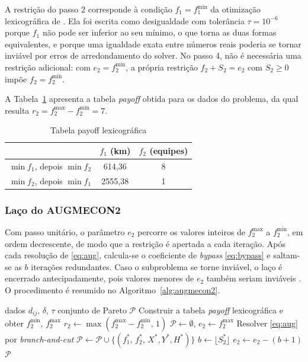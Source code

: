 \documentclass[conference]{IEEEtran}
\begin{document}
A restrição do passo 2 corresponde à condição $f_1 = f_1^{\min}$ da otimização lexicográfica de \cite{mavrotas2009}. Ela foi escrita como desigualdade com tolerância $\tau = 10^{-6}$ porque $f_1$ não pode ser inferior ao seu mínimo, o que torna as duas formas equivalentes, e porque uma igualdade exata entre números reais poderia se tornar inviável por erros de arredondamento do solver. No passo 4, não é necessária uma restrição adicional: com $e_2 = f_2^{\min}$, a própria restrição $f_2 + S_2 = e_2$ com $S_2 \ge 0$ impõe $f_2 = f_2^{\min}$.

A Tabela~\ref{tab:payoff} apresenta a tabela \textit{payoff} obtida para os dados do problema, da qual resulta $r_2 = f_2^{\max} - f_2^{\min} = 7$.

\begin{table}[!t]
\renewcommand{\arraystretch}{1.2}
\caption{Tabela payoff lexicográfica}
\label{tab:payoff}
\centering
\begin{tabular}{lcc}
\hline
 & $f_1$ (km) & $f_2$ (equipes)\\
\hline
$\min f_1$, depois $\min f_2$ & 614,36 & 8\\
$\min f_2$, depois $\min f_1$ & 2555,38 & 1\\
\hline
\end{tabular}
\end{table}

\subsubsection{Laço do AUGMECON2}
Com passo unitário, o parâmetro $e_2$ percorre os valores inteiros de $f_2^{\max}$ a $f_2^{\min}$, em ordem decrescente, de modo que a restrição é apertada a cada iteração. Após cada resolução de \eqref{eq:aug}, calcula-se o coeficiente de \textit{bypass} \eqref{eq:bypass} e saltam-se as $b$ iterações redundantes. Caso o subproblema se torne inviável, o laço é encerrado antecipadamente, pois valores menores de $e_2$ também seriam inviáveis \cite{mavrotas2009}. O procedimento é resumido no Algoritmo~\ref{alg:augmecon2}.

\begin{algorithm}[!t]
\caption{AUGMECON2 aplicado ao problema}
\label{alg:augmecon2}
\begin{algorithmic}[1]
\Require dados $d_{ij}$, $\delta$, $\tau$
\Ensure conjunto de Pareto $\mathcal{P}$
\State Construir a tabela \textit{payoff} lexicográfica e obter $f_2^{\min}$, $f_2^{\max}$
\State $r_2 \gets \max(f_2^{\max} - f_2^{\min},\, 1)$
\State $\mathcal{P} \gets \emptyset$, \quad $e_2 \gets f_2^{\max}$
  \State Resolver \eqref{eq:aug} por \textit{branch-and-cut}
    \State \Break
  \EndIf
  \State $\mathcal{P} \gets \mathcal{P} \cup \{(f_1^{*},\, f_2^{*},\, X^{*}, Y^{*}, H^{*})\}$
  \State $b \gets \lfloor S_2^{*} \rfloor$ 
  \State $e_2 \gets e_2 - (b + 1)$
\EndWhile
\State \Return $\mathcal{P}$
\end{algorithmic}
\end{algorithm}
\end{document}
